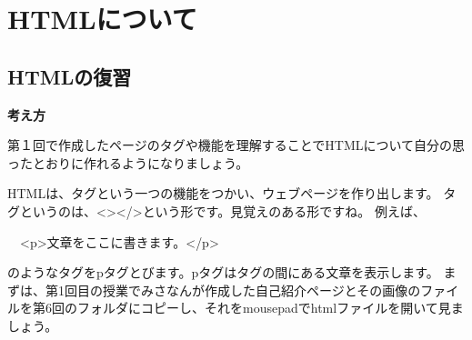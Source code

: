 \documentclass[text06.tex]{subfiles}
\begin{document}
%
%
\section{HTMLについて}
\label{P:HTML}

%
%
\subsection{HTMLの復習\label{E:HTML}}

\bigskip

{\bfseries 考え方}

第１回で作成したページのタグや機能を理解することでHTMLについて自分の思ったとおりに作れるようになりましょう。



HTMLは、タグという一つの機能をつかい、ウェブページを作り出します。\newline
タグというのは、{\textless}{\textgreater}{\textless}/{\textgreater}という形です。見覚えのある形ですね。\newline
例えば、

\ \ {\textless}p{\textgreater}文章をここに書きます。{\textless}/p{\textgreater}

のようなタグをpタグとびます。pタグはタグの間にある文章を表示します。\newline
まずは、第1回目の授業でみさなんが作成した自己紹介ページとその画像のファイルを第6回のフォルダにコピーし、それをmousepadでhtmlファイルを開いて見ましょう。
\end{document}
